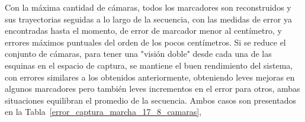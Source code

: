 Con la máxima cantidad de cámaras, todos los marcadores son reconstruidos y sus trayectorias seguidas a lo largo de la secuencia, con las medidas de error ya encontradas hasta el momento, de error de marcador menor al centímetro, y errores máximos puntuales del orden de los pocos centímetros. Si se reduce el conjunto de cámaras, para tener una "visión doble" desde cada una de las esquinas en el espacio de captura, se mantiene el buen rendimiento del sistema, con errores similares a los obtenidos anteriormente, obteniendo leves mejoras en algunos marcadores pero también leves incrementos en el error para otros, ambas situaciones equilibran el promedio de la secuencia. Ambos casos son presentados en la Tabla~\ref{error_captura_marcha_17_8_camaras},

\begin{table}[h]
\end{table}
